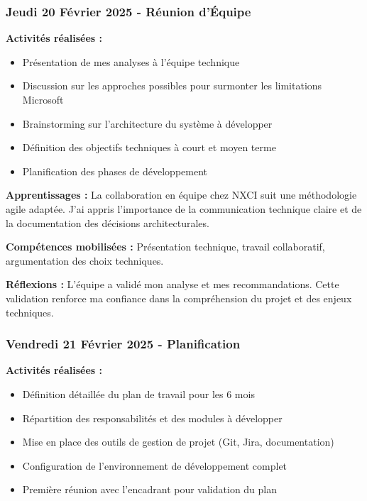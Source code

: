 \subsubsection{Jeudi 20 Février 2025 - Réunion d'Équipe}

\textbf{Activités réalisées :}
\begin{itemize}
    \item Présentation de mes analyses à l'équipe technique
    \item Discussion sur les approches possibles pour surmonter les limitations Microsoft
    \item Brainstorming sur l'architecture du système à développer
    \item Définition des objectifs techniques à court et moyen terme
    \item Planification des phases de développement
\end{itemize}

\textbf{Apprentissages :}
La collaboration en équipe chez NXCI suit une méthodologie agile adaptée. J'ai appris l'importance de la communication technique claire et de la documentation des décisions architecturales.

\textbf{Compétences mobilisées :}
Présentation technique, travail collaboratif, argumentation des choix techniques.

\textbf{Réflexions :}
L'équipe a validé mon analyse et mes recommandations. Cette validation renforce ma confiance dans la compréhension du projet et des enjeux techniques.

\subsubsection{Vendredi 21 Février 2025 - Planification}

\textbf{Activités réalisées :}
\begin{itemize}
    \item Définition détaillée du plan de travail pour les 6 mois
    \item Répartition des responsabilités et des modules à développer
    \item Mise en place des outils de gestion de projet (Git, Jira, documentation)
    \item Configuration de l'environnement de développement complet
    \item Première réunion avec l'encadrant pour validation du plan
\end{itemize}

